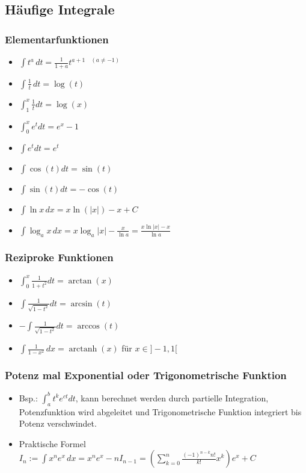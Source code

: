 \documentclass[a3paper, 11pt, landscape]{scrartcl}
\DeclareMathOperator\arctanh{arctanh}
\begin{document}
\begin{multicols*}{3}
	\subsection{Häufige Integrale}
	\subsubsection{Elementarfunktionen}
	\begin{itemize}
	    \item $\int t^{a} \,d t=\frac{1}{1+a} t^{a+1  \quad(a \neq-1)}$
	    \item $ \int \frac{1}{t} \,d t=\log (t) $
	    \item $\int_{1}^{x} \frac{1}{t} d t=\log (x)$
	    \item $\int_{0}^{x} e^{t} d t=e^{x}-1$
	    \item $\int e^{t} d t=e^{t}$
	    \item $\int \cos (t) d t=\sin (t)$
	    \item $ \int \sin (t) d t=-\cos (t)$
	    \item $\int\ln x\,dx = x\ln (|x| )-x +C$
	    \item $\int\log_a x\,dx = x\log_a |x| - \frac{x}{\ln a} = \frac{x\ln |x| - x}{\ln a}$
	\end{itemize}
	\subsubsection{Reziproke Funktionen}
	\begin{itemize}
	    \item $\int_{0}^{x} \frac{1}{1+t^{2}} d t=\arctan (x)$
	    \item $\int \frac{1}{\sqrt{1-t^{2}}} d t=\arcsin (t)$
	    \item $-\int \frac{1}{\sqrt{1-t^{2}}} d t=\arccos (t)$
	    \item $\int \frac{1}{1-x^2}\,dx = \arctanh (x)$ für $x\in ]-1,1[$
	\end{itemize}
	\subsubsection{Potenz mal Exponential oder Trigonometrische Funktion}
	\begin{itemize}
	    \item Bsp.: $\int_{a}^{b} t^{k} e^{c t} d t$, kann berechnet werden durch partielle Integration, Potenzfunktion wird abgeleitet und Trigonometrische Funktion integriert bis Potenz verschwindet.
	    \item Praktische Formel $I_n := \int x^n e^x \,dx = x^n e^x -n I_{n-1} = \left(\sum_{k=0}^{n} \frac{(-1)^{n-k} n !}{k !} x^{k}\right) e^{x}+C$
	\end{itemize}

\end{multicols*}
\end{document}
